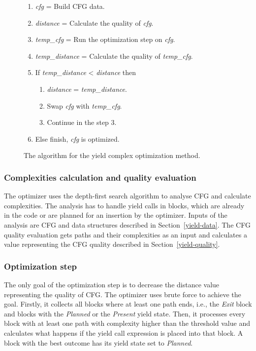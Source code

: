 \begin{figure}[h!]
\caption{The algorithm for the yield complex optimization method.}
\label{yield-algorithm}
\begin{enumerate}
\item{\emph{cfg} = Build CFG data.}
\item{\emph{distance} = Calculate the quality of \emph{cfg}.}
\item{\emph{temp\_cfg} = Run the optimization step on \emph{cfg}.}
\item{\emph{temp\_distance} = Calculate the quality of \emph{temp\_cfg}.}
\item{If \emph{temp\_distance} < \emph{distance} then}
	\begin{enumerate}[label=5.\arabic*.]
	\item{\emph{distance} = \emph{temp\_distance}.}
	\item{Swap \emph{cfg} with \emph{temp\_cfg}.}
	\item{Continue in the step 3.}
	\end{enumerate}
\item{Else finish, \emph{cfg} is optimized.}
\end{enumerate}
\end{figure}

\pagebreak[4]

\subsubsection{Complexities calculation and quality evaluation}
The optimizer uses the depth-first search algorithm to analyse CFG and calculate complexities. The analysis has to handle yield calls in blocks, which are already in the code or are planned for an insertion by the optimizer. Inputs of the analysis are CFG and data structures described in Section~\ref{yield-data}. The CFG quality evaluation gets paths and their complexities as an input and calculates a value representing the CFG quality described in Section~\ref{yield-quality}.

\subsubsection{Optimization step}
The only goal of the optimization step is to decrease the distance value representing the quality of CFG. The optimizer uses brute force to achieve the goal. Firstly, it collects all blocks where at least one path ends, i.e., the \textit{Exit} block and blocks with the \emph{Planned} or the \emph{Present} yield state. Then, it processes every block with at least one path with complexity higher than the threshold value and calculates what happens if the yield call expression is placed into that block. A block with the best outcome has its yield state set to \emph{Planned}.

